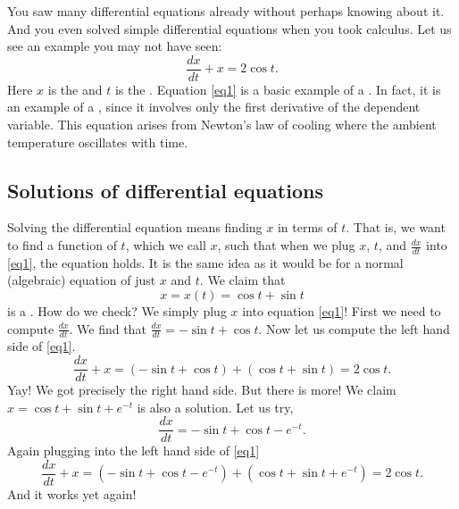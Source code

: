 You saw many
differential equations already without perhaps knowing about it.
And you even solved simple
differential equations when you took calculus.
Let us see an example you may not have seen:
\begin{equation} \label{eq1}
\frac{dx}{dt} + x = 2 \cos t .
\end{equation}
Here $x$ is the \emph{} and $t$ is the
\emph{}.
Equation \eqref{eq1}
is a basic example of a \emph{}.  In fact, it
is an example of a \emph{}, since
it involves only the first derivative of the dependent variable.  This 
equation arises from Newton's law of cooling where the ambient
temperature oscillates with time.

\subsection{Solutions of differential equations}

Solving the differential equation means finding $x$ in terms of $t$.  That
is, we want to find a function of $t$, which we call $x$, such that when
we plug $x$, $t$, and $\frac{dx}{dt}$ into \eqref{eq1}, the equation holds.
It is
the same idea as it would be for a normal (algebraic) equation of just
$x$ and $t$.  We claim that
\begin{equation*}
x = x(t) = \cos t + \sin t
\end{equation*}
is a \emph{}.
How do we check?  We simply plug $x$ into equation \eqref{eq1}!  First we
need to compute $\frac{dx}{dt}$.  We find that $\frac{dx}{dt} = 
-\sin t + \cos t$.  Now let us compute the left hand side
of \eqref{eq1}.
\begin{equation*}
\frac{dx}{dt} + x = 
(-\sin t + \cos t)
+
(\cos t + \sin t)
=
2\cos t .
\end{equation*}
Yay!  We got precisely the right hand side.
But there is more!
We claim
$x = \cos t + \sin t + e^{-t}$ is also
a solution.  Let us try,
\begin{equation*}
\frac{dx}{dt} = -\sin t + \cos t - e^{-t} .
\end{equation*}
Again plugging into the left hand side of \eqref{eq1}
\begin{equation*}
\frac{dx}{dt} + x = 
(-\sin t + \cos t - e^{-t}) +
(\cos t + \sin t + e^{-t})
= 2\cos t .
\end{equation*}
And it works yet again!

